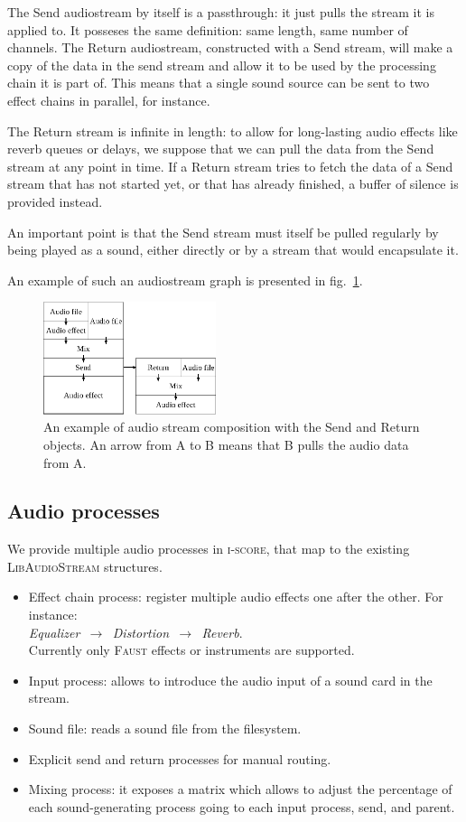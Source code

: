 \documentclass{article}
\newcommand*{\LibAudioStream}{\textsc{LibAudioStream}\xspace}
\newcommand*{\iscore}{\textsc{i-score}\xspace}
\newcommand*{\faust}{\textsc{Faust}\xspace}
\begin{document}
The Send audiostream by itself is a passthrough: it just pulls the stream it is applied to.
It posseses the same definition: same length, same number of channels.
The Return audiostream, constructed with a Send stream, will make a copy of the data in 
the send stream and allow it to be used by the processing chain it is part of.
This means that a single sound source can be sent to two effect chains in parallel, for instance.

The Return stream is infinite in length: to allow for long-lasting audio effects 
like reverb queues or delays, we suppose that we can pull the data from the Send stream at any point in time.
If a Return stream tries to fetch the data of a Send stream that has not started yet, or that has already finished, a buffer of silence is provided instead.

An important point is that the Send stream must itself be pulled regularly by being played as a sound, either directly or by a stream that would encapsulate it.

An example of such an audiostream graph is presented in fig.~\ref{fig.mixsendreturn}.

\begin{figure}[h]
	\centering
	\includegraphics[width=0.45\textwidth]{figures/graph2.eps}
	\caption{An example of audio stream composition with the Send and Return objects. An arrow from A to B means that B pulls the audio data from A.}
	\label{fig.mixsendreturn}
\end{figure}

\subsection{Audio processes}
\label{sec.processes}
We provide multiple audio processes in \iscore, that map 
to the existing \LibAudioStream structures.

\begin{itemize}
	\item Effect chain process: register multiple audio effects one after the other. 
	For instance:~\\ \emph{Equalizer $\,\to\,$ Distortion $\,\to\,$ Reverb}. ~\\
	Currently only \faust effects or instruments are supported.
	\item Input process: allows to introduce the audio input of a sound card in the stream.
	\item Sound file: reads a sound file from the filesystem.
	\item Explicit send and return processes for manual routing.
	\item Mixing process: it exposes a matrix which allows to adjust the percentage of each sound-generating process going to each input process, send, and parent.
\end{itemize}
\end{document}
